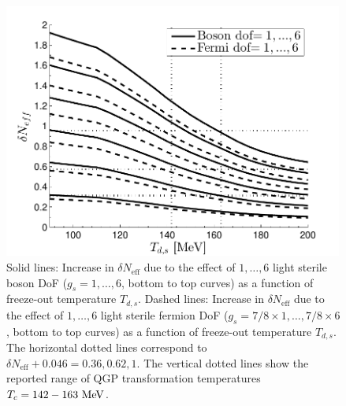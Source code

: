 \begin{figure}
\centering
\begin{minipage}[b]{.49\textwidth}
\centerline{\hspace*{0.4cm}\includegraphics[height=8.4cm]{04-birrell/ModelIndStudy/Figures/Neff_Td_combined.pdf}}
\end{minipage}
\caption{Solid lines: Increase in $\delta N_{\text{eff}}$ due to the effect of $1,\dots,6$ light sterile boson DoF ($g_s=1,\dots,6$, bottom to top curves) as a function of freeze-out temperature $T_{d,s}$. Dashed lines: Increase in $\delta N_{\text{eff}}$ due to the effect of $1,\dots,6$ light sterile fermion DoF ($g_s=7/8\times 1,\dots,7/8\times 6$, bottom to top curves) as a function of freeze-out temperature $T_{d,s}$. The horizontal dotted lines correspond to $\delta N_{\text{eff}}+0.046=0.36,0.62,1$. The vertical dotted lines show the reported range of QGP transformation temperatures $T_c=142-163\text{ MeV}$. \label{fig:Neff_Td_zoom}}
\end{figure}



